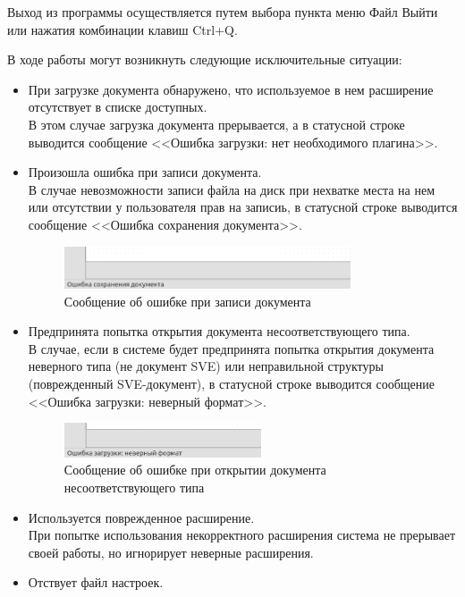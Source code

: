 Выход из программы осуществляется путем выбора пункта меню Файл \rarr Выйти или нажатия комбинации клавиш Ctrl+Q.


В ходе работы могут возникнуть следующие исключительные ситуации:
\begin{itemize}
  \item При загрузке документа обнаружено, что используемое в нем расширение отсутствует в списке доступных.\\
  В этом случае загрузка документа прерывается, а в статусной строке выводится сообщение <<Ошибка загрузки: нет необходимого плагина>>.
  \item Произошла ошибка при записи документа.\\
  В случае невозможности записи файла на диск при нехватке места на нем или отсутствии у пользователя прав на записиь, в статусной строке выводится сообщение <<Ошибка сохранения документа>>.
  \begin{figure}[H]
    \centering
    \includegraphics[width=0.8\textwidth]{gui/errors/save.png}
    \caption{Сообщение об ошибке при записи документа}
  \end{figure}
  \item Предпринята попытка открытия документа несоответствующего типа.\\
  В случае, если в системе будет предпринята попытка открытия документа неверного типа (не документ SVE) или неправильной структуры (поврежденный SVE-документ), в статусной строке выводится сообщение <<Ошибка загрузки: неверный формат>>.
  \begin{figure}[H]
    \centering
    \includegraphics[width=0.55\textwidth]{gui/errors/load.png}
    \caption{Сообщение об ошибке при открытии документа несоответствующего типа}
  \end{figure}
  \item Используется поврежденное расширение.\\
  При попытке использования некорректного расширения система не прерывает своей работы, но игнорирует неверные расширения.
  \item Отствует файл настроек.\\

\end{itemize}
